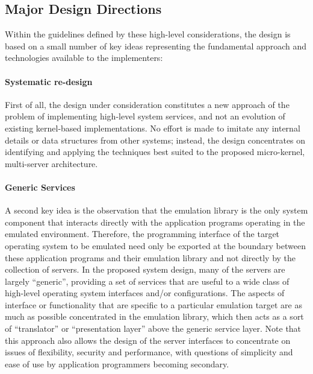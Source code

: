 \subsection{Major Design Directions}

Within the guidelines defined by these high-level considerations, the
design is based on a small number of key ideas representing the
fundamental approach and technologies available to the implementers:

\paragraph{Systematic re-design}
First of all, the design under consideration constitutes a new
approach of the problem of implementing high-level system services,
and not an evolution of existing kernel-based implementations.  No
effort is made to imitate any internal details or data structures from
other systems; instead, the design concentrates on identifying and
applying the techniques best suited to the proposed micro-kernel,
multi-server architecture.

\paragraph{Generic Services}
A second key idea is the observation that the emulation library is the
only system component that interacts directly with the application
programs operating in the emulated environment. Therefore, the
programming interface of the target operating system to be emulated
need only be exported at the boundary between these application
programs and their emulation library and not directly by the
collection of servers. In the proposed system design, many of the
servers are largely ``generic'', providing a set of services that are
useful to a wide class of high-level operating system interfaces
and/or configurations. The aspects of interface or functionality that
are specific to a particular emulation target are as much as possible
concentrated in the emulation library, which then acts as a sort of
``translator'' or ``presentation layer'' above the generic service
layer. Note that this approach also allows the design of the server
interfaces to concentrate on issues of flexibility, security and
performance, with questions of simplicity and ease of use by
application programmers becoming secondary.


